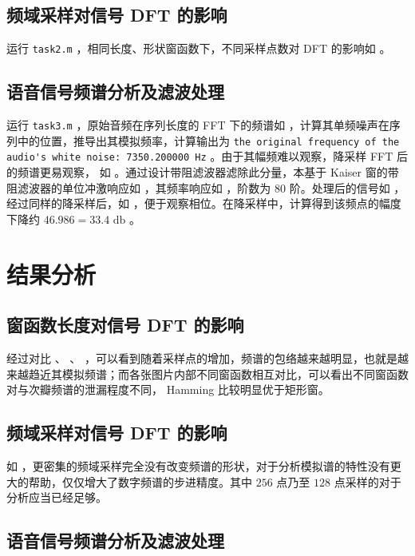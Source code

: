 \documentclass[lang=cn,11pt,a4paper,cite=authoryear]{elegantpaper}
\begin{document}

\subsection{频域采样对信号 DFT 的影响}

运行 \lstinline{task2.m} ，相同长度、形状窗函数下，不同采样点数对 DFT 的影响如  。


\subsection{语音信号频谱分析及滤波处理}

运行 \lstinline{task3.m} ，原始音频在序列长度的 FFT 下的频谱如  ，计算其单频噪声在序列中的位置，推导出其模拟频率，计算输出为 \lstinline{the original frequency of the audio's white noise: 7350.200000 Hz} 。由于其幅频难以观察，降采样 FFT 后的频谱更易观察， 如  。通过设计带阻滤波器滤除此分量，本基于 Kaiser 窗的带阻滤波器的单位冲激响应如  ，其频率响应如  ，阶数为 80 阶。处理后的信号如  ，经过同样的降采样后，如  ，便于观察相位。在降采样中，计算得到该频点的幅度下降约 \(46.986 = 33.4 \text{ db}\) 。







\section{结果分析}


\subsection{窗函数长度对信号 DFT 的影响}

经过对比  、  、 ，可以看到随着采样点的增加，频谱的包络越来越明显，也就是越来越趋近其模拟频谱；而各张图片内部不同窗函数相互对比，可以看出不同窗函数对与次瓣频谱的泄漏程度不同， Hamming 比较明显优于矩形窗。

\subsection{频域采样对信号 DFT 的影响}

如  ，更密集的频域采样完全没有改变频谱的形状，对于分析模拟谱的特性没有更大的帮助，仅仅增大了数字频谱的步进精度。其中 \(256\) 点乃至 \(128\) 点采样的对于分析应当已经足够。

\subsection{语音信号频谱分析及滤波处理}



\end{document}
